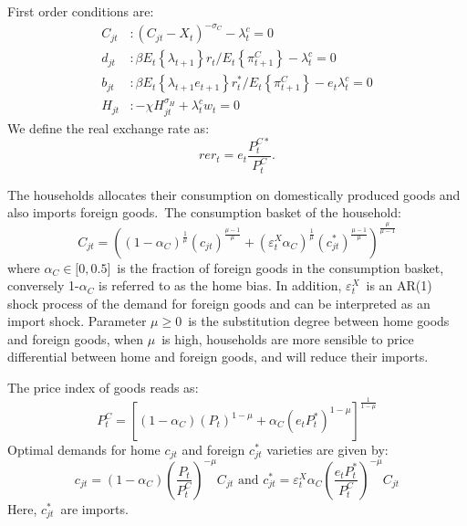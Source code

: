 \documentclass[a4paper,12pt]{article}%
\begin{document}
First order conditions are:%
\begin{align}
C_{jt} &  :\left(  C_{jt}-X_{t}\right)  ^{-\sigma_{C}}-\lambda_{t}^{c}=0\\
d_{jt} &  :\beta E_{t}\left\{  \lambda_{t+1}\right\}  r_{t}/E_{t}\left\{
\pi_{t+1}^{C}\right\}  -\lambda_{t}^{c}=0\\
b_{jt} &  :\beta E_{t}\left\{  \lambda_{t+1}e_{t+1}\right\}  r_{t}^{\ast
}/E_{t}\left\{  \pi_{t+1}^{C}\right\}  -e_{t}\lambda_{t}^{c}=0\\
H_{jt} &  :-\chi H_{jt}^{\sigma_{H}}+\lambda_{t}^{c}w_{t}=0
\end{align}
We define the real exchange rate as:%
\begin{equation}
rer_{t}=e_{t}\frac{P_{t}^{C\ast}}{P_{t}^{C}}.
\end{equation}


The households allocates their consumption on domestically produced goods and
also imports foreign goods.\ The consumption basket of the household:%
\begin{equation}
C_{jt}=\left(  \left(  1-\alpha_{C}\right)  ^{\frac{1}{\mu}}\left(
c_{jt}\right)  ^{\frac{\mu-1}{\mu}}+\left(  \varepsilon_{t}^{X}\alpha
_{C}\right)  ^{\frac{1}{\mu}}\left(  c_{jt}^{\ast}\right)  ^{\frac{\mu-1}{\mu
}}\right)  ^{\frac{\mu}{\mu-1}}%
\end{equation}
where $\alpha_{C}\in\lbrack0,0.5]$\ is the fraction of foreign goods in the
consumption basket, conversely 1-$\alpha_{C}$ is referred to as the home bias.
In addition, $\varepsilon_{t}^{X}$\ is an AR(1) shock process of the demand
for foreign goods and can be interpreted as an import shock. Parameter
$\mu\geq0$\ is the substitution degree between home goods and foreign goods,
when $\mu$\ is high, households are more sensible to price differential
between home and foreign goods, and will reduce their imports.

The price index of goods reads as:%
\begin{equation}
P_{t}^{C}=\left[  \left(  1-\alpha_{C}\right)  \left(  P_{t}\right)  ^{1-\mu
}+\alpha_{C}\left(  e_{t}P_{t}^{\ast}\right)  ^{1-\mu}\right]  ^{\frac
{1}{1-\mu}}%
\end{equation}
Optimal demands for home $c_{jt}$ and foreign $c_{jt}^{\ast}$ varieties are
given by:%
\begin{equation}
c_{jt}=\left(  1-\alpha_{C}\right)  \left(  \frac{P_{t}}{P_{t}^{C}}\right)
^{-\mu}C_{jt}\text{ and }c_{jt}^{\ast}=\varepsilon_{t}^{X}\alpha_{C}\left(
\frac{e_{t}P_{t}^{\ast}}{P_{t}^{C}}\right)  ^{-\mu}C_{jt}%
\end{equation}
Here, $c_{jt}^{\ast}$\ are imports.
\end{document}

